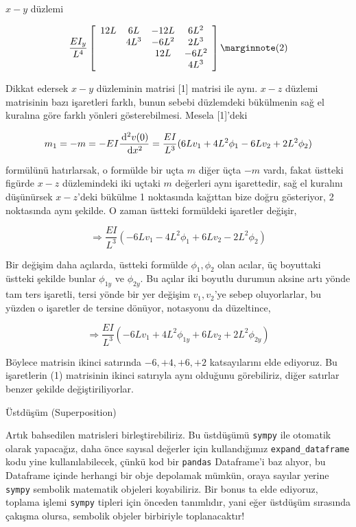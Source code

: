 \documentclass[12pt,fleqn]{article}\usepackage{../../common}
\begin{document}
$x-y$ düzlemi

$$
\frac{EI_y}{L^4}
\left[\begin{array}{cccc}
12L & 6L  & -12L & 6L^2 \\
    & 4L^3 & -6L^2 & 2L^3  \\
    &      & 12L  & -6L^2  \\
    &      &      & 4L^3
\end{array}\right]
\mlabel{2}
$$

Dikkat edersek $x-y$ düzleminin matrisi [1] matrisi ile aynı. $x-z$ düzlemi
matrisinin bazı işaretleri farklı, bunun sebebi düzlemdeki bükülmenin sağ el
kuralına göre farklı yönleri gösterebilmesi. Mesela [1]'deki 

$$
m_1 = -m = -EI \frac{\,\mathrm{d}^2 v(0)}{\,\mathrm{d} x^2} =
\frac{EI}{L^3} ( 6L v_1 + 4L^2 \phi_1 - 6L v_2 + 2 L^2 \phi_2 )
$$

formülünü hatırlarsak, o formülde bir uçta $m$ diğer üçta $-m$ vardı, fakat
üstteki figürde $x-z$ düzlemindeki iki uçtaki $m$ değerleri aynı işarettedir,
sağ el kuralını düşünürsek $x-z$'deki bükülme 1 noktasında kağıttan bize doğru
gösteriyor, 2 noktasında aynı şekilde. O zaman üstteki formüldeki işaretler
değişir,

$$
\Rightarrow \frac{EI}{L^3} ( -6L v_1 - 4L^2 \phi_1 + 6L v_2 - 2 L^2 \phi_2 )
$$

Bir değişim daha açılarda, üstteki formülde $\phi_1,\phi_2$ olan acılar,
üç boyuttaki üstteki şekilde bunlar $\phi_{1y}$ ve $\phi_{2y}$. Bu açılar
iki boyutlu durumun aksine artı yönde tam ters işaretli, tersi yönde bir
yer değişim $v_1,v_2$'ye sebep oluyorlarlar, bu yüzden o işaretler de
tersine dönüyor, notasyonu da düzeltince,

$$
\Rightarrow \frac{EI}{L^3} ( -6L v_1 + 4L^2 \phi_{1y} + 6L v_2 + 2 L^2 \phi_{2y} )
$$

Böylece matrisin ikinci satırında $-6,+4,+6,+2$ katsayılarını elde ediyoruz.
Bu işaretlerin (1) matrisinin ikinci satırıyla aynı olduğunu görebiliriz,
diğer satırlar benzer şekilde değiştiriliyorlar.

Üstdüşüm (Superposition)

Artık bahsedilen matrisleri birleştirebiliriz. Bu üstdüşümü \verb!sympy!  ile
otomatik olarak yapacağız, daha önce sayısal değerler için kullandığımız
\verb!expand_dataframe! kodu yine kullanılabilecek, çünkü kod bir \verb!pandas!
Dataframe'i baz alıyor, bu Dataframe içinde herhangi bir obje depolamak mümkün,
oraya sayılar yerine \verb!sympy! sembolik matematik objeleri koyabiliriz. Bir
bonus ta elde ediyoruz, toplama işlemi \verb!sympy! tipleri için önceden
tanımlıdır, yani eğer üstdüşüm sırasında çakışma olursa, sembolik objeler
birbiriyle toplanacaktır!
\end{document}

